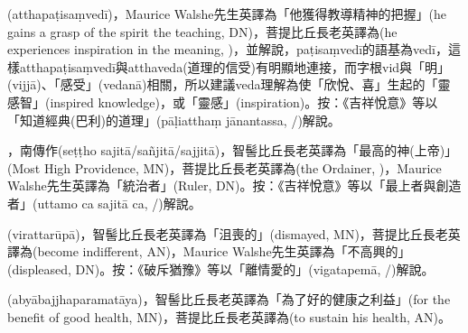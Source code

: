 \startitemgroup[noteitems]
\item{}(atthapaṭisaṃvedī)，Maurice Walshe先生英譯為「他獲得教導精神的把握」(he gains a grasp of the spirit the teaching, DN)，菩提比丘長老英譯為(he experiences inspiration in the meaning, )，並解說，paṭisaṃvedī的語基為vedī，這樣atthapaṭisaṃvedī與atthaveda(道理的信受)有明顯地連接，而字根vid與「明」(vijjā)、「感受」(vedanā)相關，所以建議veda理解為使「欣悅、喜」生起的「靈感智」(inspired knowledge)，或「靈感」(inspiration)。按：《吉祥悅意》等以「知道經典(巴利)的道理」(pāḷiatthaṃ jānantassa, /)解說。
\stopitemgroup

\startitemgroup[noteitems]
\item{}，南傳作(seṭṭho sajitā/sañjitā/sajjitā)，智髻比丘長老英譯為「最高的神(上帝)」(Most High Providence, MN)，菩提比丘長老英譯為(the Ordainer, )，Maurice Walshe先生英譯為「統治者」(Ruler, DN)。按：《吉祥悅意》等以「最上者與創造者」(uttamo ca sajitā ca, /)解說。
\stopitemgroup

\startitemgroup[noteitems]
\item{}(virattarūpā)，智髻比丘長老英譯為「沮喪的」(dismayed, MN)，菩提比丘長老英譯為(become indifferent, AN)，Maurice Walshe先生英譯為「不高興的」(displeased, DN)。按：《破斥猶豫》等以「離情愛的」(vigatapemā, /)解說。
\stopitemgroup

\startitemgroup[noteitems]
\item{}(abyābajjhaparamatāya)，智髻比丘長老英譯為「為了好的健康之利益」(for the benefit of good health, MN)，菩提比丘長老英譯為(to sustain his health, AN)。
\stopitemgroup

